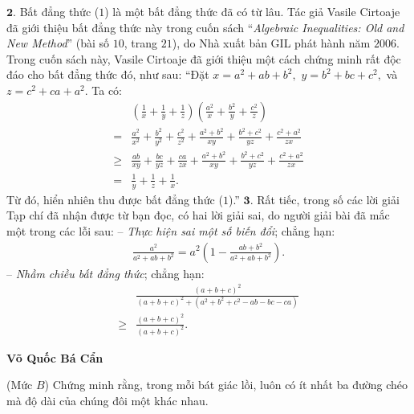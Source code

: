 \begin{multicols}{2}
	\vskip 0.05cm
	$\pmb{2.}$ Bất đẳng thức ($1$) là một bất đẳng thức đã có từ lâu. Tác giả Vasile Cirtoaje đã giới thiệu bất đẳng thức này trong cuốn sách “\textit{Algebraic Inequalities: Old and New Method}” (bài số $10$, trang $21$), do Nhà xuất bản GIL phát hành năm $2006$. Trong cuốn sách này, Vasile Cirtoaje đã giới thiệu một cách chứng minh rất độc đáo cho bất đẳng thức đó,  như sau:
	\vskip 0.05cm
	“Đặt $x = {a^2} + ab + {b^2},$ $y = {b^2} + bc + {c^2},$      và $z = {c^2} + ca + {a^2}$.  Ta có:
	\begin{align*}
		&\left( {\frac{1}{x} + \frac{1}{y} + \frac{1}{z}} \right)\left( {\frac{{{a^2}}}{x} + \frac{{{b^2}}}{y} + \frac{{{c^2}}}{z}} \right)\\
		= &\frac{{{a^2}}}{{{x^2}}} \!+\! \frac{{{b^2}}}{{{y^2}}} \!+\! \frac{{{c^2}}}{{{z^2}}} \!+\! \frac{{{a^2} \!+\! {b^2}}}{{xy}} \!+\! \frac{{{b^2} \!+\! {c^2}}}{{yz}} \!+\! \frac{{{c^2} \!+\! {a^2}}}{{zx}}\\
		\ge &\frac{{ab}}{{xy}} \!+\! \frac{{bc}}{{yz}} \!+\! \frac{{ca}}{{zx}} \!+\! \frac{{{a^2} \!+\! {b^2}}}{{xy}} \!+\! \frac{{{b^2} \!+\! {c^2}}}{{yz}} \!+\! \frac{{{c^2}\! +\! {a^2}}}{{zx}}\\
		= &\frac{1}{y} + \frac{1}{z} + \frac{1}{x}.
	\end{align*}
	Từ đó, hiển nhiên thu được bất đẳng thức ($1$).”
	\vskip 0.05cm
	$\pmb{3.}$ Rất tiếc, trong số các lời giải Tạp chí đã nhận được từ bạn đọc, có hai lời giải sai, do người giải bài đã mắc một trong các lỗi sau:
	\vskip 0.05cm
	-- \textit{Thực hiện sai một số biến đổi}; chẳng hạn:
	\begin{align*}
		\frac{{{a^2}}}{{{a^2} + ab + {b^2}}} = {a^2}\left( {1 - \frac{{ab + {b^2}}}{{{a^2} + ab + {b^2}}}} \right).
	\end{align*}
	-- \textit{Nhầm chiều bất đẳng thức}; chẳng hạn:
	\begin{align*}
		&\frac{{{{\left( {a + b + c} \right)}^2}}}{{{{\left( {a \!+\! b \!+\! c} \right)}^2} \!+\! \left( {{a^2} \!+\! {b^2} \!+\! {c^2} \!-\! ab \!-\! bc \!-\! ca} \right)}} \\
		\ge &\frac{{{{\left( {a + b + c} \right)}^2}}}{{{{\left( {a + b + c} \right)}^2}}}.
	\end{align*}
	\begin{flushright}
		\textbf{\color{thachthuctoanhoc}Võ Quốc Bá Cẩn}
	\end{flushright}
	{}
	(Mức $B$)
	Chứng minh rằng, trong mỗi bát giác lồi, luôn có ít nhất ba đường chéo mà độ dài của chúng đôi một khác nhau.

\end{multicols}

